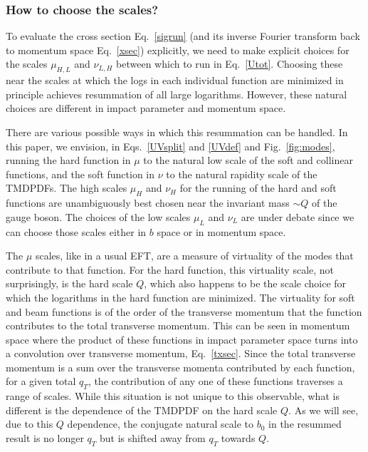 \documentclass[a4,letterpaper,11pt]{article}
\newcommand{\eq}[1]{Eq.~\eqref{#1}}
\newcommand{\eqs}[2]{Eqs.~\eqref{#1} and \eqref{#2}}
\newcommand{\fig}[1]{Fig.~\ref{fig:#1}}
\begin{document}
\subsubsection{How to choose the scales?}

To evaluate the cross section \eq{sigrun} (and its inverse Fourier transform back to momentum space \eq{xsec}) explicitly, we need to make explicit choices for the scales $\mu_{H,L}$ and $\nu_{L,H}$ between which to run in \eq{Utot}. Choosing these near the scales at which the logs in each individual function are minimized in principle achieves resummation of all large logarithms. However, these natural choices are different in impact parameter and momentum space.

There are various possible ways in which this resummation can be handled. In this paper, we envision, in \eqs{UVsplit}{UVdef} and \fig{modes}, running the hard function in $\mu$ to the natural low scale of the soft and collinear functions, and the soft function in $\nu$ to the natural rapidity scale of the TMDPDFs.
The high scales $\mu_H$ and $\nu_H$ for the running of the hard and soft functions are unambiguously best chosen near the invariant mass $\sim Q$ of the gauge boson. The choices of the low scales $\mu_L$ and $\nu_L$ are under debate since we can choose those scales either in $b$ space or in momentum space.

The $\mu$ scales, like in a usual EFT, are a measure of virtuality of the modes that contribute to that function. For the hard function, this virtuality scale, not surprisingly, is the hard scale $Q$, which also happens to be the scale  choice for which the logarithms in the hard function are minimized.
The virtuality for soft and beam functions is of the order of the transverse momentum that the function contributes to the total transverse momentum. This can be seen in momentum space where the product of these functions in impact parameter space turns into a convolution over transverse momentum, \eq{txsec}.  Since the total transverse momentum is a sum over the transverse momenta contributed by each function,  for a given total $q_T$, the  contribution of any one of these functions traverses a range of scales. While this situation is not unique to this observable, what is different is the dependence of the TMDPDF on the hard scale $Q$.  As we will see, due to this $Q$ dependence, the conjugate natural scale to $b_0$ in the resummed result is no longer  $q_T$ but is shifted away from $q_T$ towards $Q$.
\end{document}
